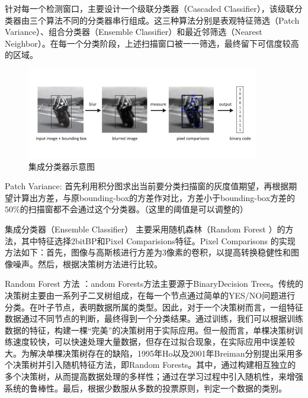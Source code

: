 针对每一个检测窗口，主要设计一个级联分类器（Cascaded Classifier），该级联分类器由三个算法不同的分类器串行组成。这三种算法分别是表观特征筛选（Patch Variance）、组合分类器（Ensemble Classifier）和最近邻筛选（Nearest Neighbor）。在每一个分类阶段，上述扫描窗口被一一筛选，最终留下可信度较高的区域。
\begin{figure}[ht]   
	\centering
	\includegraphics[width=\textwidth]{figs/161002_Thesis_Tracking_Section_04.pdf}
	\caption{集成分类器示意图}
	\label{fig:161002_Thesis_Tracking_Section_04}
\end{figure}


Patch Variance: 首先利用积分图求出当前要分类扫描窗的灰度值期望，再根据期望计算出方差，与原bounding-box的方差作对比，方差小于bounding-box方差的$50\%$的扫描窗都不会通过这个分类器。（这里的阈值是可以调整的）

集成分类器（Ensemble Classifier） 主要采用随机森林（Random Forest ）的方法，其中特征选择2bitBP和Pixel Comparisions特征。Pixel Comparisons 的实现方法如下：首先，图像与高斯核进行方差为3像素的卷积，以提高转换稳健性和图像噪声。然后，根据决策树方法进行比较。


Random Forest 方法 ：andom Forests方法主要源于BinaryDecision Trees。传统的决策树主要由一系列子二叉树组成，在每一个节点通过简单的YES/NO问题进行分类。在叶子节点，表明数据所属的类型。因此，对于一个决策树而言，一组特征数据通过不同节点的判断，最终得到一个分类结果。通过训练，我们可以根据训练数据的特征，构建一棵“完美”的决策树用于实际应用。但一般而言，单棵决策树训练速度较快，可以快速处理大量数据，但存在过拟合现象，在实际应用中误差较大。为解决单棵决策树存在的缺陷，1995年Ho以及2001年Breiman分别提出采用多个决策树并引入随机特征方法，即Random Forests。其中，通过构建相互独立的多个决策树，从而提高数据处理的多样性；通过在学习过程中引入随机性，来增强系统的鲁棒性。最后，根据少数服从多数的投票原则，判定一个数据的类别。

